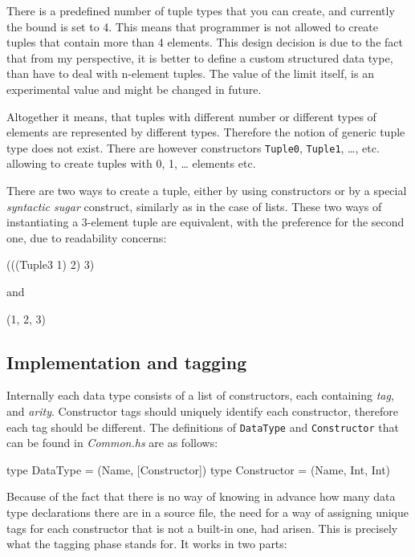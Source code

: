 \documentclass[12pt,a4paper]{report}
\begin{document}
There is a predefined number of tuple types that you can create, and currently
the bound is set to 4. This means that programmer is not allowed to create
tuples that contain more than 4 elements. This design decision is due to the
fact that from my perspective, it is better to define a custom structured data
type, than have to deal with n-element tuples. The value of the limit itself,
is an experimental value and might be changed in future.

Altogether it means, that tuples with different number or different types of
elements are represented by different types. Therefore the notion of generic
tuple type does not exist. There are however constructors \texttt{Tuple0},
\texttt{Tuple1}, \ldots, etc. allowing to create tuples with 0, 1, \ldots
elements etc.

There are two ways to create a tuple, either by using constructors or by a
special \textit{syntactic sugar} construct, similarly as in the case of lists.
These two ways of instantiating a 3-element tuple are equivalent, with the
preference for the second one, due to readability concerns:

\vspace*{0.2in}
\begin{code}[style=haskell]
(((Tuple3 1) 2) 3)
\end{code}

and

\vspace*{0.2in}
\begin{code}[style=haskell]
(1, 2, 3)
\end{code}

\subsection{Implementation and tagging}
Internally each data type consists of a list of constructors, each containing
\textit{tag}, and \textit{arity}. Constructor tags should uniquely identify
each constructor, therefore each tag should be different. The definitions of
\texttt{DataType} and \texttt{Constructor} that can be found in
\textit{Common.hs} are as follows:

\vspace*{0.2in}
\begin{code}[style=haskell]
type DataType = (Name, [Constructor])
type Constructor = (Name, Int, Int)
\end{code}

Because of the fact that there is no way of knowing in advance how many data
type declarations there are in a source file, the need for a way of assigning
unique tags for each constructor that is not a built-in one, had arisen.  This
is precisely what the tagging phase stands for. It works in two parts:
\end{document}
